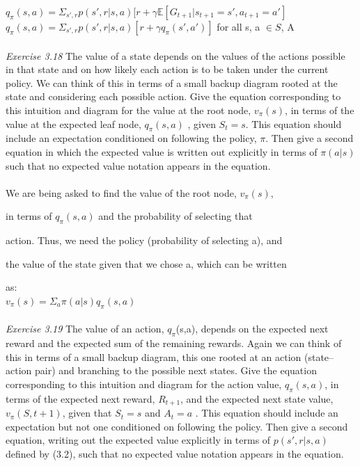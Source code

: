 \documentclass{article}
\begin{document}
$q_\pi(s, a) = \Sigma_{s', r}p(s', r|s, a)[r + \gamma\mathbb{E}[G_{t+1}|s_{t+1} = s',a_{t+1} = a']$\\

$q_\pi(s, a) = \Sigma_{s', r}p(s', r|s, a)[r + \gamma q_{\pi}(s', a')]$ for all s, a $\in S$, A \\
\\
\textit{Exercise 3.18} The value of a state depends on the values of the actions possible in that state and on how likely each action is to be taken under the current policy. We can think of this in terms of a small backup diagram rooted at the state and considering each possible action. Give the equation corresponding to this intuition and diagram for the value at the root node, $v_{\pi}(s)$, in terms of the value at the expected leaf node, $q_{\pi}(s,a)$ , given $S_t = s$. This equation should include an expectation conditioned on following the policy, $\pi$. Then give a second equation in which the expected value is written out explicitly in terms of $\pi(a|s)$ such that no expected value notation appears in the equation.  \\
\\

We are being asked to find the value of the root node, $v_{\pi}(s)$, 

in terms of $q_{\pi}(s,a)$ and the probability of selecting that 

action. Thus, we need the policy (probability of selecting a), and 

the value of the state given that we chose a, which can be written 

as:\\

$v_{\pi}(s) = \Sigma_{a}\pi(a|s)q_{\pi}(s, a)$\\
\\
\textit{Exercise 3.19} The value of an action, $q_{\pi}$(s,a), depends on the expected next reward and the expected sum of the remaining rewards. Again we can think of this in terms of a
small backup diagram, this one rooted at an action (state–action pair) and branching to the possible next states. Give the equation corresponding to this intuition and diagram for the action value,
$q_{\pi}(s,a)$, in terms of the expected next reward, $R_{t+1}$, and the expected next state value,
$v_{\pi}(S,t+1)$, given that $S_{t} = s$ and $A_{t} = a$ . This equation should include an expectation but
not one conditioned on following the policy. Then give a second equation, writing out the
expected value explicitly in terms of $p(s',r|s,a)$ defined by (3.2), such that no expected
value notation appears in the equation.\\
\\
\end{document}
